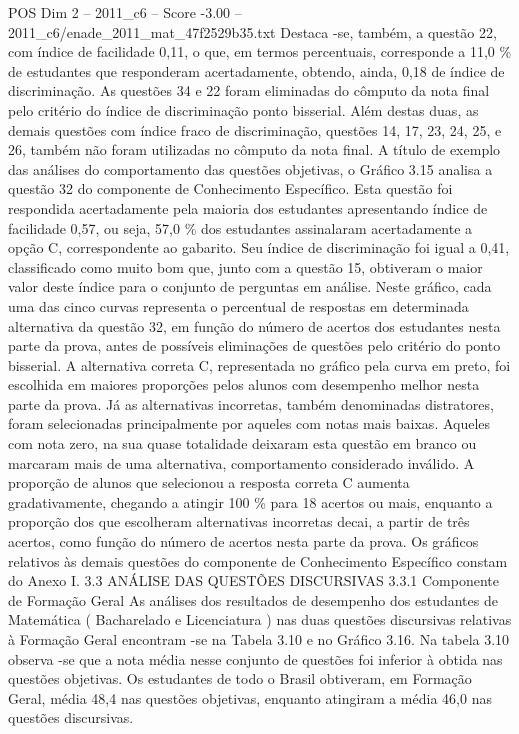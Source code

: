 \begin{textsample}{POS Dim 2 – 2011\_c6 – Score -3.00 – 2011\_c6/enade\_2011\_mat\_47f2529b35.txt}
Destaca -se, também, a questão 22, com índice de facilidade 0,11, o que, em termos percentuais, corresponde a 11,0 \% de estudantes que responderam acertadamente, obtendo, ainda, 0,18 de índice de discriminação.
As questões 34 e 22 foram eliminadas do cômputo da nota final pelo critério do índice de discriminação ponto bisserial.
Além destas duas, as demais questões com índice fraco de discriminação, questões 14, 17, 23, 24, 25, e 26, também não foram utilizadas no cômputo da nota final.
A título de exemplo das análises do comportamento das questões objetivas, o Gráfico 3.15 analisa a questão 32 do componente de Conhecimento Específico.
Esta questão foi respondida acertadamente pela maioria dos estudantes apresentando índice de facilidade 0,57, ou seja, 57,0 \% dos estudantes assinalaram acertadamente a opção C, correspondente ao gabarito.
Seu índice de discriminação foi igual a 0,41, classificado como muito bom que, junto com a questão 15, obtiveram o maior valor deste índice para o conjunto de perguntas em análise.
Neste gráfico, cada uma das cinco curvas representa o percentual de respostas em determinada alternativa da questão 32, em função do número de acertos dos estudantes nesta parte da prova, antes de possíveis eliminações de questões pelo critério do ponto bisserial.
A alternativa correta C, representada no gráfico pela curva em preto, foi escolhida em maiores proporções pelos alunos com desempenho melhor nesta parte da prova.
Já as alternativas incorretas, também denominadas distratores, foram selecionadas principalmente por aqueles com notas mais baixas.
Aqueles com nota zero, na sua quase totalidade deixaram esta questão em branco ou marcaram mais de uma alternativa, comportamento considerado inválido.
A proporção de alunos que selecionou a resposta correta C aumenta gradativamente, chegando a atingir 100 \% para 18 acertos ou mais, enquanto a proporção dos que escolheram alternativas incorretas decai, a partir de três acertos, como função do número de acertos nesta parte da prova.
Os gráficos relativos às demais questões do componente de Conhecimento Específico constam do Anexo I. 3.3 ANÁLISE DAS QUESTÕES DISCURSIVAS 3.3.1 Componente de Formação Geral As análises dos resultados de desempenho dos estudantes de Matemática ( Bacharelado e Licenciatura ) nas duas questões discursivas relativas à Formação Geral encontram -se na Tabela 3.10 e no Gráfico 3.16.
Na tabela 3.10 observa -se que a nota média nesse conjunto de questões foi inferior à obtida nas questões objetivas.
Os estudantes de todo o Brasil obtiveram, em Formação Geral, média 48,4 nas questões objetivas, enquanto atingiram a média 46,0 nas questões discursivas.

\end{textsample}
